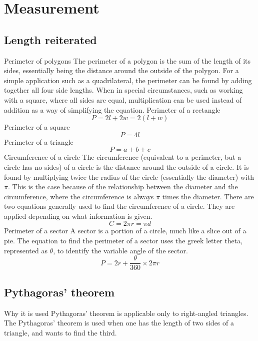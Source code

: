 \section{Measurement}
\begin{outline}

\0
\subsection{Length reiterated}
	\1 Perimeter of polygons
		\2 The perimeter of a polygon is the sum of the length of its sides, essentially being the distance around the outside of the polygon. For a simple application such as a quadrilateral, the perimeter can be found by adding together all four side lengths. When in special circumstances, such as working with a square, where all sides are equal, multiplication can be used instead of addition as a way of simplifying the equation.
			\3 Perimeter of a rectangle
				\[P = 2l + 2w = 2(l + w)\]
			\3 Perimeter of a square
				\[P = 4l\]
			\3 Perimeter of a triangle
				\[P = a + b + c\]
	\1 Circumference of a circle
		\2 The circumference (equivalent to a perimeter, but a circle has no sides) of a circle is the distance around the outside of a circle. It is found by multiplying twice the radius of the circle (essentially the diameter) with $\pi$. This is the case because of the relationship between the diameter and the circumference, where the circumference is always $\pi$ times the diameter.
			\3 There are two equations generally used to find the circumference of a circle. They are applied depending on what information is given.
				\[C = 2\pi r = \pi d\]
	\1 Perimeter of a sector
		\2 A sector is a portion of a circle, much like a slice out of a pie.
			\3 The equation to find the perimeter of a sector uses the greek letter theta, represented as $\theta$, to identify the variable angle of the sector.
				\[P = 2r+ \frac{\theta}{360} \times 2\pi r\]

\0
\subsection{Pythagoras' theorem}
	\1 Why it is used
		\2 Pythagoras' theorem is applicable only to right-angled triangles. The Pythagoras' theorem is used when one has the length of two sides of a triangle, and wants to find the third.
\begin{center}
\end{center}
\end{outline}
